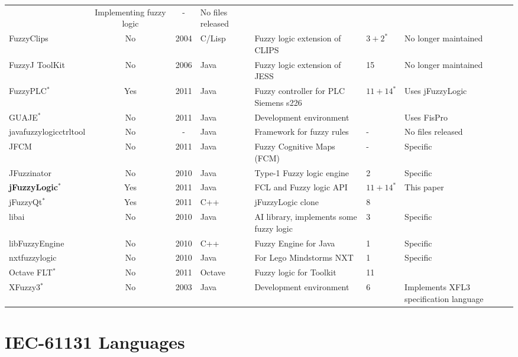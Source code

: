 \documentclass[11pt,twoside]{article}
\begin{document}
\begin{multicols}{2}
\begin{table}[ht]
{{{\begin{tabular}{@{}|@{\ }l|c|c|l|l|l|l@{\ }|@{}}
			& Implementing fuzzy logic
			& -
			& No files released
			\\			
		FuzzyClips			
			& No	
			& 2004
			& C/Lisp
			& Fuzzy logic extension of CLIPS
			& $3 + 2^*$
			& No longer maintained
			\\
		FuzzyJ ToolKit		
			& No	
			& 2006 
			& Java
			& Fuzzy logic extension of JESS
			& 15
			& No longer maintained
			\\
		FuzzyPLC$^{\ast}$
			& Yes
			& 2011
			& Java
			& Fuzzy controller for PLC Siemens s226
			& $11 + 14^*$
			& Uses jFuzzyLogic
			\\			
		GUAJE$^{\ast}$ 				
			& No
			& 2011
			& Java
			& Development environment 
			& 
			& Uses FisPro
			\\                             
		javafuzzylogicctrltool
			& No
			& -
			& Java
			& Framework for fuzzy rules
			& -
			& No files released
			\\			
		JFCM
			& No
			& 2011
			& Java
			& Fuzzy Cognitive Maps (FCM)
			& -
			& Specific
			\\
		JFuzzinator
			& No
			& 2010
			& Java
			& Type-1 Fuzzy logic engine
			& 2
			& Specific
			\\						
		\textbf{jFuzzyLogic}$^{\ast}$
			& Yes	
			& 2011 
			& Java
			& FCL and Fuzzy logic API
			& $11 + 14^*$
			& This paper 
			\\
		jFuzzyQt$^{\ast}$			
			& Yes	
			& 2011 
			& C++
			& jFuzzyLogic clone 
			& 8
			& 
			\\			
		libai			
			& No	
			& 2010 
			& Java 
			& AI library, implements some fuzzy logic 
			& 3
			& Specific
			\\			
		libFuzzyEngine
			& No
			& 2010
			& C++
			& Fuzzy Engine for Java
			& 1
			& Specific
			\\			
		nxtfuzzylogic
			& No
			& 2010
			& Java
			& For Lego Mindstorms NXT
			& 1
			& Specific
			\\			
		Octave FLT$^{\ast}$
			& No
			& 2011
			& Octave
			& Fuzzy logic for Toolkit
			& 11
			& 
			\\
		XFuzzy3$^{\ast}$
			& No
			& 2003
			& Java
			& Development environment
			& 6
			& Implements XFL3 specification language
			\\			
		\hline
	\end{tabular}}}}
\end{table}

\section{IEC-61131 Languages \label{sec:IEC}}


\end{multicols}
\end{document}
